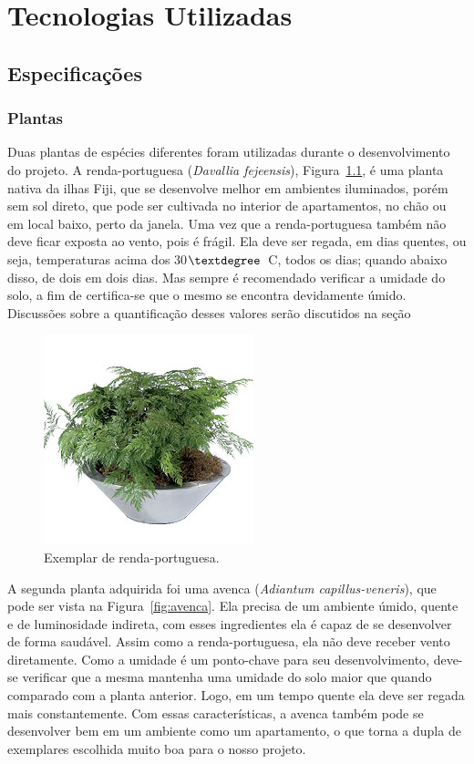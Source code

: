 \documentclass[a4paper,12pt]{report}
\begin{document}
\cleardoublepage
\chapter{Tecnologias Utilizadas}
	\label{cap:Tecnologias}
	\section{Especificações}
	
	\subsection{Plantas}
	Duas plantas de espécies diferentes foram utilizadas durante o desenvolvimento do projeto. A renda-portuguesa (\textit{Davallia fejeensis}), Figura~\ref{fig:renda}, é uma planta nativa da ilhas Fiji, que se desenvolve melhor em ambientes iluminados, porém sem sol direto, que pode ser cultivada no interior de apartamentos, no chão ou em local baixo, perto da janela. Uma vez que a renda-portuguesa também não deve ficar exposta ao vento, pois é frágil. Ela deve ser regada, em dias quentes, ou seja, temperaturas acima dos 30$\textdegree$~C, todos os dias; quando abaixo disso, de dois em dois dias. Mas sempre é recomendado verificar a umidade do solo, a fim de certifica-se que o mesmo se encontra devidamente úmido. Discussões sobre a quantificação desses valores serão discutidos na seção %
		
\begin{figure}[!h]
	\centering
	\includegraphics[width=0.4\linewidth]{figs/renda}
	\caption{Exemplar de renda-portuguesa.}
	\label{fig:renda}
\end{figure}

	A segunda planta adquirida foi uma avenca (\textit{Adiantum capillus-veneris}), que pode ser vista na Figura~\ref{fig:avenca}. Ela precisa de um ambiente úmido, quente e de luminosidade indireta, com esses ingredientes ela é capaz de se desenvolver de forma saudável. Assim como a renda-portuguesa, ela não deve receber vento diretamente. Como a umidade é um ponto-chave para seu desenvolvimento, deve-se verificar que a mesma mantenha uma umidade do solo maior que quando comparado com a planta anterior. Logo, em um tempo quente ela deve ser regada mais constantemente. Com essas características, a avenca também pode se desenvolver bem em um ambiente como um apartamento, o que torna a dupla de exemplares escolhida muito boa para o nosso projeto. 
	
\end{document}
